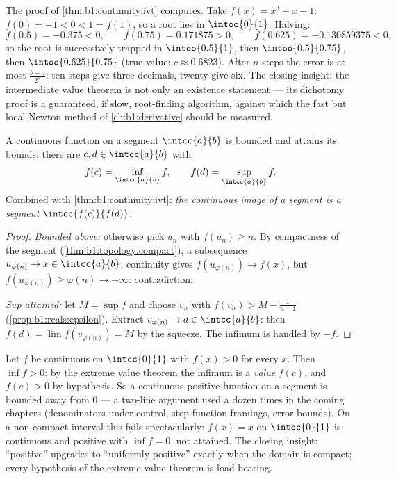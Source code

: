 \begin{example}\label{ex:b1:continuity:dichotomy}
The proof of \cref{thm:b1:continuity:ivt} computes. Take $f(x) =
x^3 + x - 1$: $f(0) = -1 < 0 < 1 = f(1)$, so a root lies in
$\intoo{0}{1}$. Halving:
\[
f(0.5) = -0.375 < 0, \qquad
f(0.75) = 0.171875 > 0, \qquad
f(0.625) = -0.130859375 < 0 ,
\]
so the root is successively trapped in $\intoo{0.5}{1}$, then
$\intoo{0.5}{0.75}$, then $\intoo{0.625}{0.75}$ (true value:
$c \approx 0.6823$). After $n$ steps the error is at most
$\frac{b - a}{2^n}$: ten steps give three decimals, twenty give
six. The closing insight: the intermediate value theorem is not
only an existence statement --- its dichotomy proof is a
guaranteed, if slow, root-finding algorithm, against which the
fast but local Newton method of \cref{ch:b1:derivative} should
be measured.
\end{example}

\begin{theorem}\label{thm:b1:continuity:evt}
A continuous function on a segment $\intcc{a}{b}$ is bounded and
attains its bounds: there are $c, d \in \intcc{a}{b}$ with
\[
f(c) = \inf_{\intcc{a}{b}} f,
\qquad
f(d) = \sup_{\intcc{a}{b}} f .
\]
Combined with \cref{thm:b1:continuity:ivt}: \emph{the continuous
image of a segment is a segment} $\intcc{f(c)}{f(d)}$.
\end{theorem}

\begin{proof}
\emph{Bounded above:} otherwise pick $u_n$ with $f(u_n) \geq n$. By
compactness of the segment (\cref{thm:b1:topology:compact}), a
subsequence $u_{\varphi(n)} \to x \in \intcc{a}{b}$; continuity gives
$f(u_{\varphi(n)}) \to f(x)$, but $f(u_{\varphi(n)}) \geq \varphi(n)
\to +\infty$: contradiction.

\emph{Sup attained:} let $M = \sup f$ and choose $v_n$ with $f(v_n) >
M - \frac{1}{n+1}$ (\cref{prop:b1:reals:epsilon}). Extract
$v_{\varphi(n)} \to d \in \intcc{a}{b}$: then $f(d) = \lim
f(v_{\varphi(n)}) = M$ by the squeeze. The infimum is handled by
$-f$.
\end{proof}

\begin{example}\label{ex:b1:continuity:posmin}
Let $f$ be continuous on $\intcc{0}{1}$ with $f(x) > 0$ for
every $x$. Then $\inf f > 0$: by the extreme value theorem the
infimum is a \emph{value} $f(c)$, and $f(c) > 0$ by hypothesis.
So a continuous positive function on a segment is bounded away
from $0$ --- a two-line argument used a dozen times in the
coming chapters (denominators under control, step-function
framings, error bounds). On a non-compact interval this fails
spectacularly: $f(x) = x$ on $\intoc{0}{1}$ is continuous and
positive with $\inf f = 0$, not attained. The closing insight:
``positive'' upgrades to ``uniformly positive'' exactly when the
domain is compact; every hypothesis of the extreme value theorem
is load-bearing.
\end{example}

